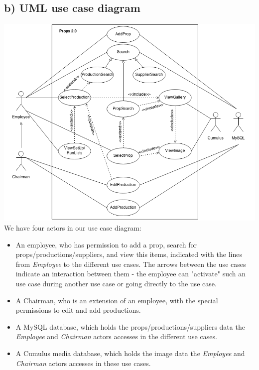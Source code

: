 \documentclass[12pt]{article}
\begin{document}
\subsection{b) UML use case diagram}
\includegraphics[scale=0.6]{use.png}\\
We have four actors in our use case diagram:
\begin{itemize}
\item An employee, who has permission to add a prop, search for props/productions/suppliers, and view this items, indicated with the lines from \textit{Employee} to the different use cases. The arrows between the use cases indicate an interaction between them - the employee can "activate" such an use case during another use case or going directly to the use case.
\item A Chairman, who is an extension of an employee, with the special permissions to edit and add productions.
\item A MySQL database, which holds the props/productions/suppliers data the \textit{Employee} and \textit{Chairman} actors accesses in the different use cases.
\item A Cumulus media database, which holds the image data the \textit{Employee} and \textit{Chairman} actors accesses in these use cases. 
\end{itemize}
\end{document}
